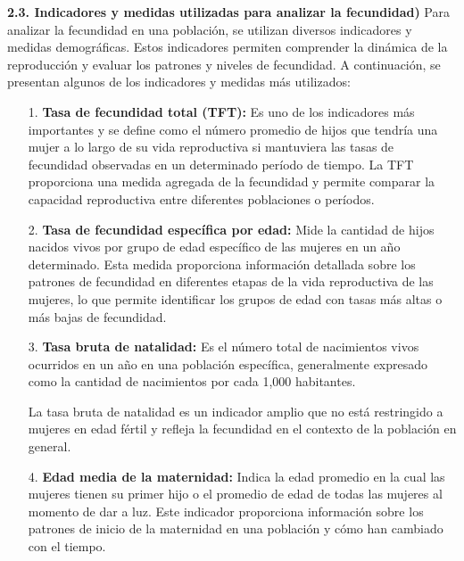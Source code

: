 \documentclass[8pt,a4paper]{beamer}
\begin{document}
{\begin{frame}{}
\begin{block}{\textbf{2.3. Indicadores y medidas utilizadas para analizar la fecundidad)}}
\setlength{\parskip}{3px}
\justifying
Para analizar la fecundidad en una población, se utilizan diversos indicadores y medidas demográficas. Estos indicadores permiten comprender la dinámica de la reproducción y evaluar los patrones y niveles de fecundidad. A continuación, se presentan algunos de los indicadores y medidas más utilizados:
\begin{enumerate}
\setlength{\parskip}{3px}
\justifying
\item[1.] \textbf{Tasa de fecundidad total (TFT):} Es uno de los indicadores más importantes y se define como el número promedio de hijos que tendría una mujer a lo largo de su vida reproductiva si mantuviera las tasas de fecundidad observadas en un determinado período de tiempo. La TFT proporciona una medida agregada de la fecundidad y permite comparar la capacidad reproductiva entre diferentes poblaciones o períodos.

\item[2.] \textbf{Tasa de fecundidad específica por edad:} Mide la cantidad de hijos nacidos vivos por grupo de edad específico de las mujeres en un año determinado. Esta medida proporciona información detallada sobre los patrones de fecundidad en diferentes etapas de la vida reproductiva de las mujeres, lo que permite identificar los grupos de edad con tasas más altas o más bajas de fecundidad.

\item[3.] \textbf{Tasa bruta de natalidad:} Es el número total de nacimientos vivos ocurridos en un año en una población específica, generalmente expresado como la cantidad de nacimientos por cada 1,000 habitantes. 
\end{enumerate}
\end{block}
\end{frame}

\begin{frame}{}
\begin{block}{}
\setlength{\parskip}{3px}
\justifying
\begin{enumerate}
\setlength{\parskip}{3px}
\justifying
\item[{}] La tasa bruta de natalidad es un indicador amplio que no está restringido a mujeres en edad fértil y refleja la fecundidad en el contexto de la población en general.

\item[4.] \textbf{Edad media de la maternidad:} Indica la edad promedio en la cual las mujeres tienen su primer hijo o el promedio de edad de todas las mujeres al momento de dar a luz. Este indicador proporciona información sobre los patrones de inicio de la maternidad en una población y cómo han cambiado con el tiempo.


\end{enumerate}
\end{block}
\end{frame}}
\end{document}
